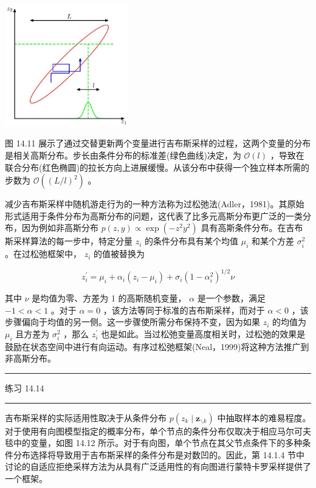 \documentclass[10pt]{report}
\newcommand{\HRule}{\begin{center}\rule{0.9\linewidth}{0.2mm}\end{center}}
\begin{document}
\begin{center}
\includegraphics[max width=0.4\textwidth]{images/0194e279-9b28-703a-88f4-c3ac21e2010d_468_970_344_579_574_0.jpg}
\end{center}
\hspace*{3em} 

图 14.11 展示了通过交替更新两个变量进行吉布斯采样的过程，这两个变量的分布是相关高斯分布。步长由条件分布的标准差(绿色曲线)决定，为 \(\mathcal{O}\left( l\right)\) ，导致在联合分布(红色椭圆)的拉长方向上进展缓慢。从该分布中获得一个独立样本所需的步数为 \(\mathcal{O}\left( {\left( L/l\right) }^{2}\right)\) 。

减少吉布斯采样中随机游走行为的一种方法称为过松弛法(Adler，1981)。其原始形式适用于条件分布为高斯分布的问题，这代表了比多元高斯分布更广泛的一类分布，因为例如非高斯分布 \(p\left( {z,y}\right)  \propto  \exp \left( {-{z}^{2}{y}^{2}}\right)\) 具有高斯条件分布。在吉布斯采样算法的每一步中，特定分量 \({z}_{i}\) 的条件分布具有某个均值 \({\mu }_{i}\) 和某个方差 \({\sigma }_{i}^{2}\) 。在过松弛框架中， \({z}_{i}\) 的值被替换为

\[
{z}_{i}^{\prime } = {\mu }_{i} + {\alpha }_{i}\left( {{z}_{i} - {\mu }_{i}}\right)  + {\sigma }_{i}{\left( 1 - {\alpha }_{i}^{2}\right) }^{1/2}\nu  \tag{14.46}
\]

其中 \(\nu\) 是均值为零、方差为 1 的高斯随机变量， \(\alpha\) 是一个参数，满足 \(- 1 < \alpha  < 1\) 。对于 \(\alpha  = 0\) ，该方法等同于标准的吉布斯采样，而对于 \(\alpha  < 0\) ，该步骤偏向于均值的另一侧。这一步骤使所需分布保持不变，因为如果 \({z}_{i}\) 的均值为 \({\mu }_{i}\) 且方差为 \({\sigma }_{i}^{2}\) ，那么 \({z}_{i}^{\prime }\) 也是如此。当过松弛变量高度相关时，过松弛的效果是鼓励在状态空间中进行有向运动。有序过松弛框架(Neal，1999)将这种方法推广到非高斯分布。

\HRule

练习 14.14

\HRule

吉布斯采样的实际适用性取决于从条件分布 \(p\left( {{z}_{k} \mid  {\mathbf{z}}_{\smallsetminus k}}\right)\) 中抽取样本的难易程度。对于使用有向图模型指定的概率分布，单个节点的条件分布仅取决于相应马尔可夫毯中的变量，如图 14.12 所示。对于有向图，单个节点在其父节点条件下的多种条件分布选择将导致用于吉布斯采样的条件分布是对数凹的。因此，第 14.1.4 节中讨论的自适应拒绝采样方法为从具有广泛适用性的有向图进行蒙特卡罗采样提供了一个框架。
\end{document}

